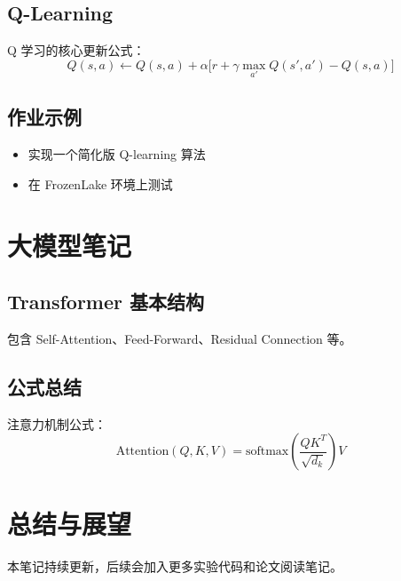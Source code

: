 \documentclass[12pt,a4paper]{article}
\begin{document}
\subsection{Q-Learning}
Q 学习的核心更新公式：
\[
Q(s,a) \leftarrow Q(s,a) + \alpha \Big[ r + \gamma \max_{a'} Q(s',a') - Q(s,a) \Big]
\]

\subsection{作业示例}
\begin{itemize}
    \item 实现一个简化版 Q-learning 算法
    \item 在 FrozenLake 环境上测试
\end{itemize}

\section{大模型笔记}

\subsection{Transformer 基本结构}
包含 Self-Attention、Feed-Forward、Residual Connection 等。

\subsection{公式总结}
注意力机制公式：
\[
\text{Attention}(Q,K,V) = \text{softmax}\left(\frac{QK^T}{\sqrt{d_k}}\right)V
\]

\section{总结与展望}
本笔记持续更新，后续会加入更多实验代码和论文阅读笔记。
\end{document}
